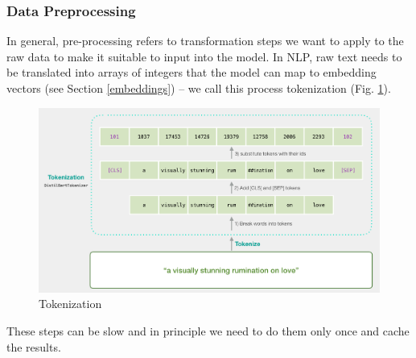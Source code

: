 \subsubsection{Data Preprocessing}
In general, pre-processing refers to transformation steps we want to apply to the raw data to make it suitable to input into the model.
In NLP, raw text needs to be translated into arrays of integers that the model can map to embedding vectors (see Section \ref{embeddings}) -- we call this process tokenization (Fig. \ref{fig:tokenization}).
\begin{figure}
    \includegraphics[width=\linewidth]{chapters/NLP/figures/tokenization.png}
    \caption{Tokenization}
    \label{fig:tokenization}
\end{figure}
These steps can be slow and in principle we need to do them only once and cache the results.


